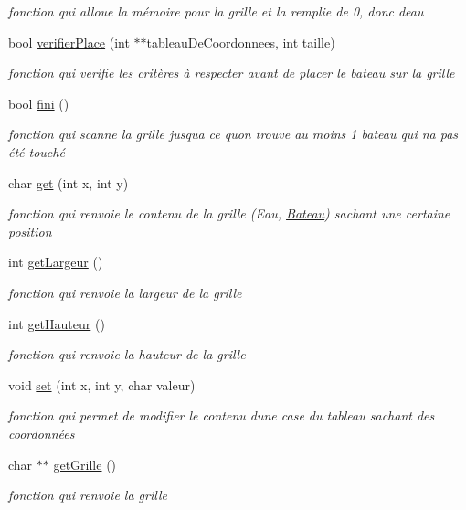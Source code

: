 \begin{DoxyCompactItemize}
\begin{DoxyCompactList}\small\item\em fonction qui alloue la mémoire pour la grille et la remplie de 0, donc d\textquotesingle{}eau \end{DoxyCompactList}\item 
bool \hyperlink{class_grille_abfcc3b88c30c6c43bfd98b7ba0a1ddaf}{verifier\+Place} (int $\ast$$\ast$tableau\+De\+Coordonnees, int taille)
\begin{DoxyCompactList}\small\item\em fonction qui verifie les critères à respecter avant de placer le bateau sur la grille \end{DoxyCompactList}\item 
bool \hyperlink{class_grille_af22b526602ad163f6e6f7f7c8f486aa2}{fini} ()
\begin{DoxyCompactList}\small\item\em fonction qui scanne la grille jusqu\textquotesingle{}a ce qu\textquotesingle{}on trouve au moins 1 bateau qui n\textquotesingle{}a pas été touché \end{DoxyCompactList}\item 
char \hyperlink{class_grille_aa75d2fdc376faefb921abd355cb60041}{get} (int x, int y)
\begin{DoxyCompactList}\small\item\em fonction qui renvoie le contenu de la grille (Eau, \hyperlink{class_bateau}{Bateau}) sachant une certaine position \end{DoxyCompactList}\item 
int \hyperlink{class_grille_ab28024c7c9d608d86cc8c42b17863439}{get\+Largeur} ()
\begin{DoxyCompactList}\small\item\em fonction qui renvoie la largeur de la grille \end{DoxyCompactList}\item 
int \hyperlink{class_grille_a4dcb62fd32a2fe9528290dc92af84373}{get\+Hauteur} ()
\begin{DoxyCompactList}\small\item\em fonction qui renvoie la hauteur de la grille \end{DoxyCompactList}\item 
void \hyperlink{class_grille_a7aa99d9ef712057608f3e5792b0f628b}{set} (int x, int y, char valeur)
\begin{DoxyCompactList}\small\item\em fonction qui permet de modifier le contenu d\textquotesingle{}une case du tableau sachant des coordonnées \end{DoxyCompactList}\item 
char $\ast$$\ast$ \hyperlink{class_grille_a28baa1d9b7de654cd0f8386945649aba}{get\+Grille} ()
\begin{DoxyCompactList}\small\item\em fonction qui renvoie la grille \end{DoxyCompactList}\end{DoxyCompactItemize}
